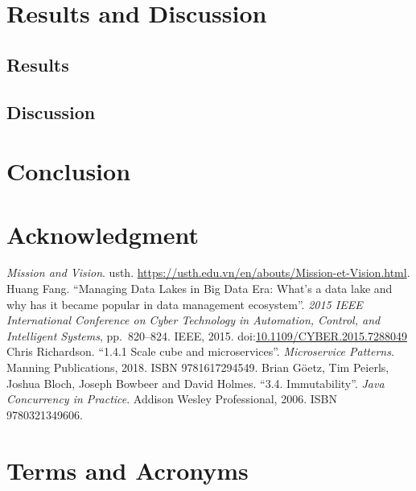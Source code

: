 \documentclass[a4paper,12pt]{book}
\newcommand{\doi}[1]{doi:\href{https://doi.org/#1}{#1}}
\begin{document}
\chapter{Results and Discussion}
\section{Results}
\section{Discussion}

\chapter{Conclusion}

\begin{appendices}
\chapter{Acknowledgment}

\begin{thebibliography}{69}
   \emph{Mission and Vision}.  \acrlong{usth}.
    \url{https://usth.edu.vn/en/abouts/Mission-et-Vision.html}.
   Huang Fang.
    ``Managing Data Lakes in Big Data Era: What's a data lake
    and why has it became popular in data management ecosystem''.
    \emph{2015 IEEE International Conference on Cyber Technology
    in Automation, Control, and Intelligent Systems}, pp.~820--824.
    IEEE, 2015.  \doi{10.1109/CYBER.2015.7288049}
   Chris Richardson.
    ``1.4.1 Scale cube and microservices''.  \emph{Microservice Patterns}.
    Manning Publications, 2018.  ISBN 9781617294549.
   Brian Göetz, Tim Peierls, Joshua Bloch,
    Joseph Bowbeer and David Holmes.
    ``3.4. Immutability''.  \emph{Java Concurrency in Practice}.
    Addison Wesley Professional, 2006.  ISBN 9780321349606.
\end{thebibliography}

\chapter{Terms and Acronyms}
\printglossaries
\end{appendices}
\end{document}
